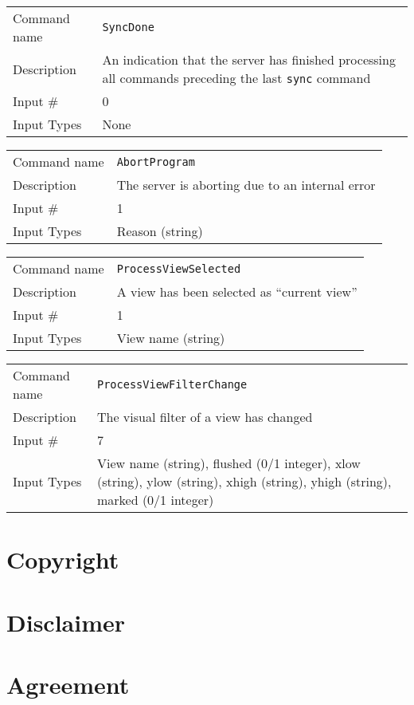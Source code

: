 \bigskip

\noindent
\begin{tabular}{l|p{5in}}
\hline
Command name & {\tt SyncDone} \\
Description  & An indication that the server has finished processing all
               commands preceding the last {\tt sync} command \\
Input \#     & 0 \\
Input Types  & None \\
\hline
\end{tabular}

\bigskip

\noindent
\begin{tabular}{l|p{5in}}
\hline
Command name & {\tt AbortProgram} \\
Description  & The server is aborting due to an internal error \\
Input \#     & 1 \\
Input Types  & Reason (string) \\
\hline
\end{tabular}

\bigskip

\noindent
\begin{tabular}{l|p{5in}}
\hline
Command name & {\tt ProcessViewSelected} \\
Description  & A view has been selected as ``current view'' \\
Input \#     & 1 \\
Input Types  & View name (string) \\
\hline
\end{tabular}

\bigskip

\noindent
\begin{tabular}{l|p{5in}}
\hline
Command name & {\tt ProcessViewFilterChange} \\
Description  & The visual filter of a view has changed \\
Input \#     & 7 \\
Input Types  & View name (string), flushed (0/1 integer), xlow (string),
               ylow (string), xhigh (string), yhigh (string),
               marked (0/1 integer) \\
\hline
\end{tabular}

\newpage 
\section*{Copyright}



\section*{Disclaimer}



\newpage
\section*{Agreement}




